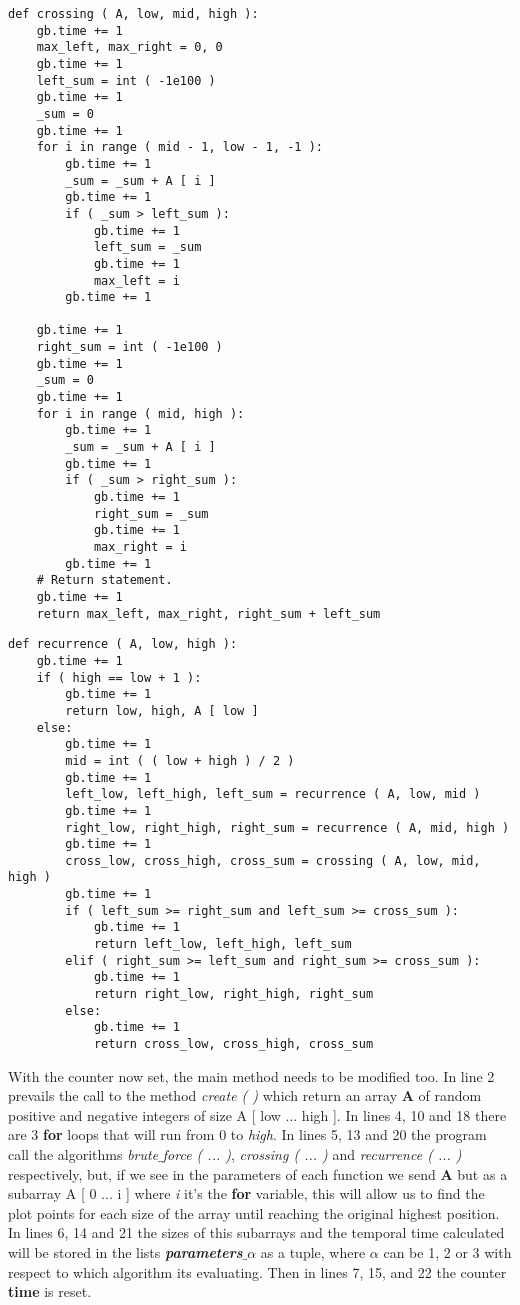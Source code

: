 \begin{lstlisting}
def crossing ( A, low, mid, high ):
    gb.time += 1
    max_left, max_right = 0, 0
    gb.time += 1
    left_sum = int ( -1e100 )
    gb.time += 1
    _sum = 0
    gb.time += 1
    for i in range ( mid - 1, low - 1, -1 ):
        gb.time += 1
        _sum = _sum + A [ i ]
        gb.time += 1
        if ( _sum > left_sum ):
            gb.time += 1
            left_sum = _sum
            gb.time += 1
            max_left = i
        gb.time += 1

    gb.time += 1
    right_sum = int ( -1e100 )
    gb.time += 1
    _sum = 0
    gb.time += 1
    for i in range ( mid, high ):
        gb.time += 1
        _sum = _sum + A [ i ]
        gb.time += 1
        if ( _sum > right_sum ):
            gb.time += 1
            right_sum = _sum
            gb.time += 1
            max_right = i
        gb.time += 1
    # Return statement.
    gb.time += 1
    return max_left, max_right, right_sum + left_sum
\end{lstlisting} \hfill

\begin{lstlisting}
def recurrence ( A, low, high ):
    gb.time += 1
    if ( high == low + 1 ):
        gb.time += 1
        return low, high, A [ low ]
    else:
        gb.time += 1
        mid = int ( ( low + high ) / 2 )
        gb.time += 1
        left_low, left_high, left_sum = recurrence ( A, low, mid )
        gb.time += 1
        right_low, right_high, right_sum = recurrence ( A, mid, high )
        gb.time += 1
        cross_low, cross_high, cross_sum = crossing ( A, low, mid, high )
        gb.time += 1
        if ( left_sum >= right_sum and left_sum >= cross_sum ):
            gb.time += 1
            return left_low, left_high, left_sum
        elif ( right_sum >= left_sum and right_sum >= cross_sum ):
            gb.time += 1
            return right_low, right_high, right_sum
        else:
            gb.time += 1
            return cross_low, cross_high, cross_sum
\end{lstlisting}

\pagebreak

With the counter now set, the main method needs to be modified too. In line 2 prevails the call to the method {\itshape create ( )} which return an array {\bfseries A} of random positive and negative integers of size A [ low ... high ]. In lines 4, 10 and 18 there are 3 {\bfseries for} loops that will run from 0 to {\itshape high}. In lines 5, 13 and 20 the program call the algorithms {\itshape brute$\_$force ( ... )}, {\itshape crossing ( ... )} and {\itshape recurrence ( ... )} respectively, but, if we see in the parameters of each function we send {\bfseries A} but as a subarray A [ 0 ... i ] where {\itshape i} it's the {\bfseries for} variable, this will allow us to find the plot points for each size of the array until reaching the original highest position. In lines 6, 14 and 21 the sizes of this subarrays and the temporal time calculated will be stored in the lists {\bfseries\itshape parameters$\_\alpha$} as a tuple, where $\alpha$ can be 1, 2 or 3 with respect to which algorithm its evaluating. Then in lines 7, 15, and 22 the counter {\bfseries time} is reset. \hfill \break

